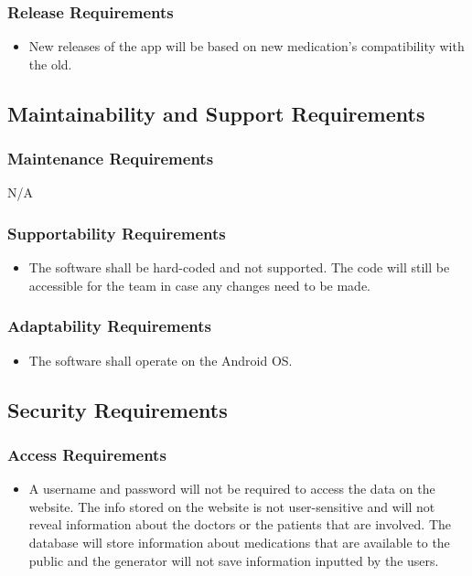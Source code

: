 \documentclass[12pt]{article}
\begin{document}
\subsubsection{Release Requirements}
\begin{itemize}
\item New releases of the app will be based on new medication’s compatibility with the old.
\end{itemize}

\subsection{Maintainability and Support Requirements}

\subsubsection{Maintenance Requirements}
N/A

\subsubsection{Supportability Requirements}
\begin{itemize}
\item The software shall be hard-coded and not supported. The code will still be accessible for the team in case any changes need to be made. 
\end{itemize}

\subsubsection{Adaptability Requirements}
\begin{itemize}
\item The software shall operate on the Android OS.
\end{itemize}

\subsection{Security Requirements}

\subsubsection{Access Requirements}
\begin{itemize}
\item A username and password will not be required to access the data on the website. The info stored on the website is not user-sensitive and will not reveal information about the doctors or the patients that are involved. The database will store information about medications that are available to the public and the generator will not save information inputted by the users.
\end{itemize}
\end{document}
